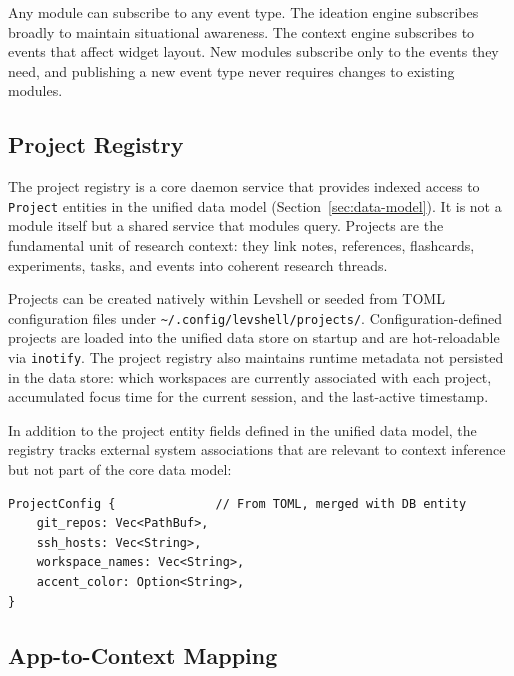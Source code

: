 \documentclass[11pt,a4paper]{article}
\begin{document}
Any module can subscribe to any event type. The ideation engine subscribes broadly to maintain situational awareness. The context engine subscribes to events that affect widget layout. New modules subscribe only to the events they need, and publishing a new event type never requires changes to existing modules.

\subsection{Project Registry}
\label{sec:project-registry}

The project registry is a core daemon service that provides indexed access to \texttt{Project} entities in the unified data model (Section~\ref{sec:data-model}). It is not a module itself but a shared service that modules query. Projects are the fundamental unit of research context: they link notes, references, flashcards, experiments, tasks, and events into coherent research threads.

Projects can be created natively within Levshell or seeded from TOML configuration files under \texttt{\textasciitilde/.config/levshell/projects/}. Configuration-defined projects are loaded into the unified data store on startup and are hot-reloadable via \texttt{inotify}. The project registry also maintains runtime metadata not persisted in the data store: which workspaces are currently associated with each project, accumulated focus time for the current session, and the last-active timestamp.

In addition to the project entity fields defined in the unified data model, the registry tracks external system associations that are relevant to context inference but not part of the core data model:

\begin{lstlisting}[language={}]
ProjectConfig {              // From TOML, merged with DB entity
    git_repos: Vec<PathBuf>,
    ssh_hosts: Vec<String>,
    workspace_names: Vec<String>,
    accent_color: Option<String>,
}
\end{lstlisting}

\subsection{App-to-Context Mapping}
\label{sec:app-context}
\end{document}
